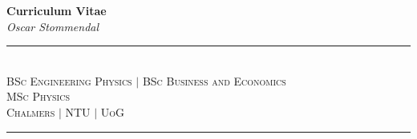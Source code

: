 \documentclass[a4paper,12pt]{article}
\begin{document}
\pagestyle{fancy}
\fancyhf{} %
\renewcommand{\headrulewidth}{0pt}


{\Huge \textbf{Curriculum Vitae \\[0.3cm]}} 
{\Large \textit{Oscar Stommendal}} \\[-0.7cm]

\rule{11.9cm}{0.4pt} \\[-0.6cm]

\textsc{BSc Engineering Physics $\vert$ BSc Business and Economics \\ MSc Physics \\[0.2cm] Chalmers $\vert$ NTU $\vert$ UoG}\\[-0.9cm]

\rule{11.9cm}{0.4pt}
\end{document}
